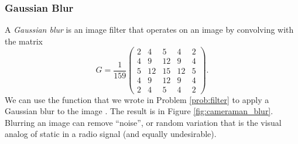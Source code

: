 \subsubsection*{Gaussian Blur}
A \emph{Gaussian blur} is an image filter that operates on an image by convolving with the matrix
\[
G = \frac{1}{159}\begin{pmatrix}
2&4&5&4&2\\
4&9&12&9&4\\
5&12&15&12&5\\
4&9&12&9&4\\
2&4&5&4&2
\end{pmatrix}.
\]
We can use the function  that we wrote in Problem \ref{prob:filter} to apply a Gaussian blur to the image . 
The result is in Figure \ref{fig:cameraman_blur}.
Blurring an image can remove ``noise'', or random variation that is the visual analog of static in a radio signal (and equally undesirable).

